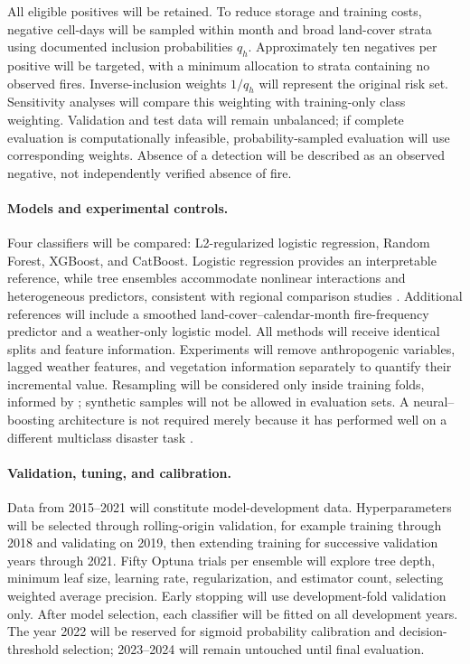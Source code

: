 \documentclass[pdflatex,sn-mathphys-num]{sn-jnl}
\begin{document}
All eligible positives will be retained. To reduce storage and training costs, negative cell-days will be sampled within month and broad land-cover strata using documented inclusion probabilities $q_h$. Approximately ten negatives per positive will be targeted, with a minimum allocation to strata containing no observed fires. Inverse-inclusion weights $1/q_h$ will represent the original risk set. Sensitivity analyses will compare this weighting with training-only class weighting. Validation and test data will remain unbalanced; if complete evaluation is computationally infeasible, probability-sampled evaluation will use corresponding weights. Absence of a detection will be described as an observed negative, not independently verified absence of fire.

\paragraph{Models and experimental controls.}
Four classifiers will be compared: L2-regularized logistic regression, Random Forest, XGBoost, and CatBoost. Logistic regression provides an interpretable reference, while tree ensembles accommodate nonlinear interactions and heterogeneous predictors, consistent with regional comparison studies \cite{iban2024shap,ouazri2026catboost}. Additional references will include a smoothed land-cover--calendar-month fire-frequency predictor and a weather-only logistic model. All methods will receive identical splits and feature information. Experiments will remove anthropogenic variables, lagged weather features, and vegetation information separately to quantify their incremental value. Resampling will be considered only inside training folds, informed by \cite{camacho2026resampling}; synthetic samples will not be allowed in evaluation sets. A neural--boosting architecture is not required merely because it has performed well on a different multiclass disaster task \cite{saleem2025neuralxgb}.

\paragraph{Validation, tuning, and calibration.}
Data from 2015--2021 will constitute model-development data. Hyperparameters will be selected through rolling-origin validation, for example training through 2018 and validating on 2019, then extending training for successive validation years through 2021. Fifty Optuna trials per ensemble will explore tree depth, minimum leaf size, learning rate, regularization, and estimator count, selecting weighted average precision. Early stopping will use development-fold validation only. After model selection, each classifier will be fitted on all development years. The year 2022 will be reserved for sigmoid probability calibration and decision-threshold selection; 2023--2024 will remain untouched until final evaluation.
\end{document}
